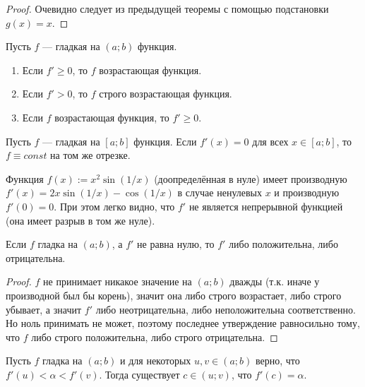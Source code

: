 \documentclass[12pt,a4paper]{article}
\begin{document}
    \begin{proof}
        Очевидно следует из предыдущей теоремы с помощью подстановки $g(x) = x$.
    \end{proof}

    \begin{theorem}
        Пусть $f$ --- гладкая на $(a; b)$ функция.
        \begin{enumerate}
            \item Если $f' \geqslant 0$, то $f$ возрастающая функция.
            \item Если $f' > 0$, то $f$ строго возрастающая функция.
            \item Если $f$ возрастающая функция, то $f' \geqslant 0$.
        \end{enumerate}
    \end{theorem}

    \begin{theorem}
        Пусть $f$ --- гладкая на $[a; b]$ функция. Если $f'(x) = 0$ для всех $x \in [a; b]$, то $f \equiv const$ на том же отрезке.
    \end{theorem}

    \begin{remark}
        Функция $f(x) := x^2 \sin(1/x)$ (доопределённая в нуле) имеет производную $f'(x) = 2x\sin(1/x) - \cos(1/x)$ в случае ненулевых $x$ и производную $f'(0) = 0$. При этом легко видно, что $f'$ не является непрерывной функцией (она имеет разрыв в том же нуле).
    \end{remark}

    \begin{theorem}
        Если $f$ гладка на $(a; b)$, а $f'$ не равна нулю, то $f'$ либо положительна, либо отрицательна.
    \end{theorem}

    \begin{proof}
        $f$ не принимает никакое значение на $(a; b)$ дважды (т.к. иначе у производной был бы корень), значит она либо строго возрастает, либо строго убывает, а значит $f'$ либо неотрицательна, либо неположительна соответственно. Но ноль принимать не может, поэтому последнее утверждение равносильно тому, что $f$ либо строго положительна, либо строго отрицательна.
    \end{proof}

    \begin{theorem}
        Пусть $f$ гладка на $(a; b)$ и для некоторых $u, v \in (a; b)$ верно, что $f'(u) < \alpha < f'(v)$. Тогда существует $c \in (u; v)$, что $f'(c) = \alpha$.
    \end{theorem}
\end{document}

